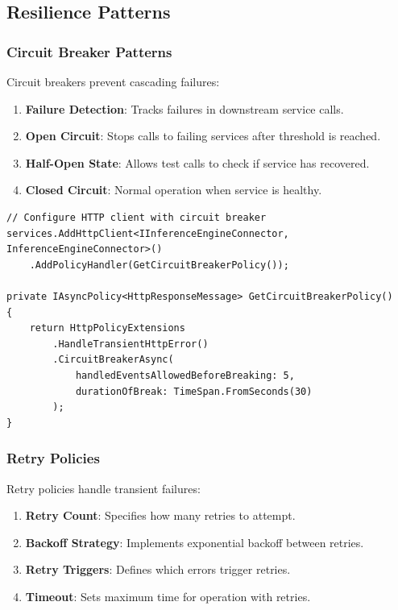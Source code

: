 \subsection{Resilience Patterns}

\subsubsection{Circuit Breaker Patterns}

Circuit breakers prevent cascading failures:

\begin{enumerate}
   \item \textbf{Failure Detection}: Tracks failures in downstream service calls.
   \item \textbf{Open Circuit}: Stops calls to failing services after threshold is reached.
   \item \textbf{Half-Open State}: Allows test calls to check if service has recovered.
   \item \textbf{Closed Circuit}: Normal operation when service is healthy.
\end{enumerate}

\begin{verbatim}
// Configure HTTP client with circuit breaker
services.AddHttpClient<IInferenceEngineConnector, InferenceEngineConnector>()
    .AddPolicyHandler(GetCircuitBreakerPolicy());
    
private IAsyncPolicy<HttpResponseMessage> GetCircuitBreakerPolicy()
{
    return HttpPolicyExtensions
        .HandleTransientHttpError()
        .CircuitBreakerAsync(
            handledEventsAllowedBeforeBreaking: 5,
            durationOfBreak: TimeSpan.FromSeconds(30)
        );
}
\end{verbatim}

\subsubsection{Retry Policies}

Retry policies handle transient failures:

\begin{enumerate}
   \item \textbf{Retry Count}: Specifies how many retries to attempt.
   \item \textbf{Backoff Strategy}: Implements exponential backoff between retries.
   \item \textbf{Retry Triggers}: Defines which errors trigger retries.
   \item \textbf{Timeout}: Sets maximum time for operation with retries.
\end{enumerate}

